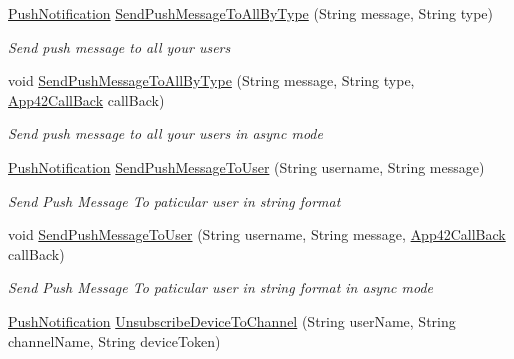 \begin{DoxyCompactItemize}
\hyperlink{classcom_1_1shephertz_1_1app42_1_1paas_1_1sdk_1_1csharp_1_1push_notification_1_1_push_notification}{Push\+Notification} \hyperlink{classcom_1_1shephertz_1_1app42_1_1paas_1_1sdk_1_1csharp_1_1push_notification_1_1_push_notification_service_a9ad8dce6020be3ff55b6a664f288f280}{Send\+Push\+Message\+To\+All\+By\+Type} (String message, String type)
\begin{DoxyCompactList}\small\item\em Send push message to all your users \end{DoxyCompactList}\item 
void \hyperlink{classcom_1_1shephertz_1_1app42_1_1paas_1_1sdk_1_1csharp_1_1push_notification_1_1_push_notification_service_a1584a7b60a3392bf178adc644d75e254}{Send\+Push\+Message\+To\+All\+By\+Type} (String message, String type, \hyperlink{interfacecom_1_1shephertz_1_1app42_1_1paas_1_1sdk_1_1csharp_1_1_app42_call_back}{App42\+Call\+Back} call\+Back)
\begin{DoxyCompactList}\small\item\em Send push message to all your users in async mode \end{DoxyCompactList}\item 
\hyperlink{classcom_1_1shephertz_1_1app42_1_1paas_1_1sdk_1_1csharp_1_1push_notification_1_1_push_notification}{Push\+Notification} \hyperlink{classcom_1_1shephertz_1_1app42_1_1paas_1_1sdk_1_1csharp_1_1push_notification_1_1_push_notification_service_a54b8613256d70bbe18ff5c362c209c7c}{Send\+Push\+Message\+To\+User} (String username, String message)
\begin{DoxyCompactList}\small\item\em Send Push Message To paticular user in string format \end{DoxyCompactList}\item 
void \hyperlink{classcom_1_1shephertz_1_1app42_1_1paas_1_1sdk_1_1csharp_1_1push_notification_1_1_push_notification_service_a1fed9e42beef5c038ed4ee1c30687366}{Send\+Push\+Message\+To\+User} (String username, String message, \hyperlink{interfacecom_1_1shephertz_1_1app42_1_1paas_1_1sdk_1_1csharp_1_1_app42_call_back}{App42\+Call\+Back} call\+Back)
\begin{DoxyCompactList}\small\item\em Send Push Message To paticular user in string format in async mode \end{DoxyCompactList}\item 
\hyperlink{classcom_1_1shephertz_1_1app42_1_1paas_1_1sdk_1_1csharp_1_1push_notification_1_1_push_notification}{Push\+Notification} \hyperlink{classcom_1_1shephertz_1_1app42_1_1paas_1_1sdk_1_1csharp_1_1push_notification_1_1_push_notification_service_ad652d8c0bbcd2736f09b5c91ae6ad19f}{Unsubscribe\+Device\+To\+Channel} (String user\+Name, String channel\+Name, String device\+Token)

\end{DoxyCompactItemize}
